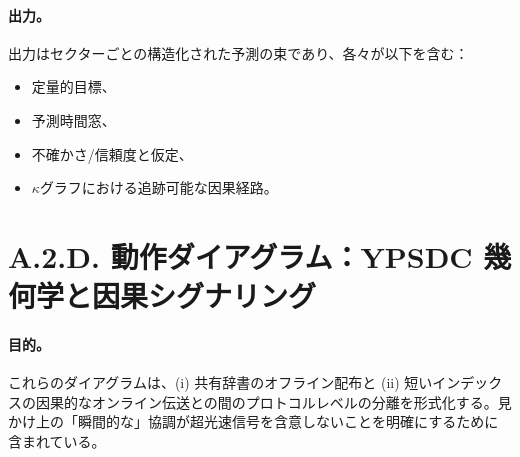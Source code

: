 \documentclass[13pt,a4paper]{ltjsarticle}
\begin{document}
	\paragraph{出力。}
	出力はセクターごとの構造化された予測の束であり、各々が以下を含む：
	\begin{itemize}[leftmargin=*]
		\item 定量的目標、
		\item 予測時間窓、
		\item 不確かさ/信頼度と仮定、
		\item $\kappa$グラフにおける追跡可能な因果経路。
	\end{itemize}
	
	\section*{A.2.D. 動作ダイアグラム：YPSDC 幾何学と因果シグナリング}
	
	\paragraph{目的。}
	これらのダイアグラムは、(i) 共有辞書のオフライン配布と (ii) 短いインデックスの因果的なオンライン伝送との間のプロトコルレベルの分離を形式化する。見かけ上の「瞬間的な」協調が超光速信号を含意しないことを明確にするために含まれている。
	
\end{document}

